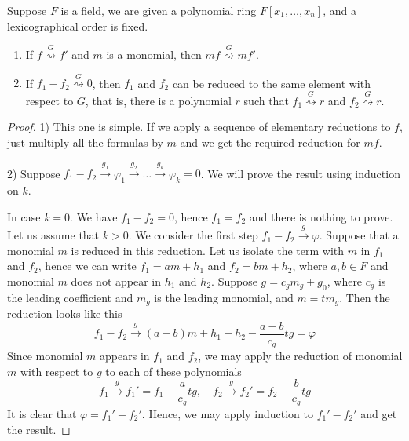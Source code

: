 \begin{claim}
\label{claim::ReductionProps}
Suppose $F$ is a field, we are given a polynomial ring $F[x_1,\ldots,x_n]$, and a lexicographical order is fixed.
\begin{enumerate}
\item If $f\stackrel{G}{\rightsquigarrow}f'$ and $m$ is a monomial, then $mf \stackrel{G}{\rightsquigarrow}mf'$.

\item If $f_1 - f_2 \stackrel{G}{\rightsquigarrow}0$, then $f_1$ and $f_2$ can be reduced to the same element with respect to $G$, that is, there is a polynomial $r$ such that $f_1\stackrel{G}{\rightsquigarrow}r$ and $f_2\stackrel{G}{\rightsquigarrow}r$.
\end{enumerate}
\end{claim}
\begin{proof}
1) This one is simple.
If we apply a sequence of elementary reductions to $f$, just multiply all the formulas by $m$ and we get the required reduction for $mf$.

2) Suppose $f_1 - f_2 \stackrel{g_1}{\longrightarrow}\varphi_1 \stackrel{g_2}{\longrightarrow}\ldots  \stackrel{g_k}{\longrightarrow}\varphi_k = 0$.
We will prove the result using induction on $k$.

In case $k = 0$.
We have $f_1 - f_2 = 0$, hence $f_1 = f_2$ and there is nothing to prove.
Let us assume that $k > 0$.
We consider the first step $f_1 - f_2 \stackrel{g}{\longrightarrow}\varphi$.
Suppose that a monomial $m$ is reduced in this reduction.
Let us isolate the term with $m$ in $f_1$ and $f_2$, hence we can write $f_1 = a m + h_1$ and $f_2 = bm + h_2$, where $a,b\in F$ and monomial $m$ does not appear in $h_1$ and $h_2$.
Suppose $g = c_g m_g + g_0$, where $c_g$ is the leading coefficient and $m_g$ is the leading monomial, and $m = t m_g$.
Then the reduction looks like this
\[
f_1 - f_2 \stackrel{g}{\longrightarrow}(a-b)m + h_1 -h_2 - \frac{a-b}{c_g}t g = \varphi
\]
Since monomial $m$ appears in $f_1$ and $f_2$, we may apply the reduction of monomial $m$ with respect to $g$ to each of these polynomials
\[
f_1 \stackrel{g}{\longrightarrow}f_1'=f_1 - \frac{a}{c_g}tg,\quad
f_2 \stackrel{g}{\longrightarrow}f_2'=f_2 - \frac{b}{c_g}tg
\]
It is clear that $\varphi = f_1' - f_2'$.
Hence, we may apply induction to $f_1'-f_2'$ and get the result.
\end{proof}

